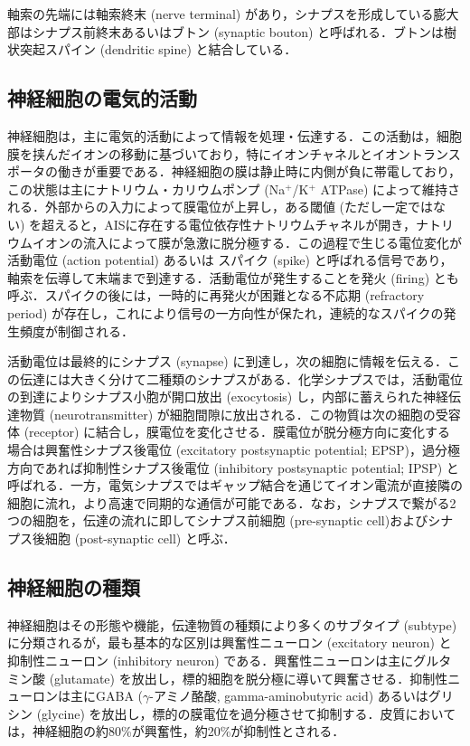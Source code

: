 \documentclass[titlepage]{ltjsbook}
\begin{document}
軸索の先端には軸索終末 (nerve terminal) があり，シナプスを形成している膨大部はシナプス前終末あるいはブトン (synaptic bouton) と呼ばれる．ブトンは樹状突起スパイン (dendritic spine) と結合している．

\subsection{神経細胞の電気的活動}
神経細胞は，主に電気的活動によって情報を処理・伝達する．この活動は，細胞膜を挟んだイオンの移動に基づいており，特にイオンチャネルとイオントランスポータの働きが重要である．神経細胞の膜は静止時に内側が負に帯電しており，この状態は主にナトリウム・カリウムポンプ (Na$^+$/K$^+$ ATPase) によって維持される．外部からの入力によって膜電位が上昇し，ある閾値 (ただし一定ではない) を超えると，AISに存在する電位依存性ナトリウムチャネルが開き，ナトリウムイオンの流入によって膜が急激に脱分極する．この過程で生じる電位変化が活動電位 (action potential) あるいは スパイク (spike) と呼ばれる信号であり，軸索を伝導して末端まで到達する．活動電位が発生することを発火 (firing) とも呼ぶ．スパイクの後には，一時的に再発火が困難となる不応期 (refractory period) が存在し，これにより信号の一方向性が保たれ，連続的なスパイクの発生頻度が制御される．

活動電位は最終的にシナプス (synapse) に到達し，次の細胞に情報を伝える．この伝達には大きく分けて二種類のシナプスがある．化学シナプスでは，活動電位の到達によりシナプス小胞が開口放出 (exocytosis) し，内部に蓄えられた神経伝達物質 (neurotransmitter) が細胞間隙に放出される．この物質は次の細胞の受容体 (receptor) に結合し，膜電位を変化させる．膜電位が脱分極方向に変化する場合は興奮性シナプス後電位 (excitatory postsynaptic potential; EPSP)，過分極方向であれば抑制性シナプス後電位 (inhibitory postsynaptic potential; IPSP) と呼ばれる．一方，電気シナプスではギャップ結合を通じてイオン電流が直接隣の細胞に流れ，より高速で同期的な通信が可能である．なお，シナプスで繋がる2つの細胞を，伝達の流れに即してシナプス前細胞 (pre-synaptic cell)およびシナプス後細胞 (post-synaptic cell) と呼ぶ．

\subsection{神経細胞の種類}
神経細胞はその形態や機能，伝達物質の種類により多くのサブタイプ (subtype) に分類されるが，最も基本的な区別は興奮性ニューロン (excitatory neuron) と抑制性ニューロン (inhibitory neuron) である．興奮性ニューロンは主にグルタミン酸 (glutamate) を放出し，標的細胞を脱分極に導いて興奮させる．抑制性ニューロンは主にGABA ($\gamma$-アミノ酪酸, gamma-aminobutyric acid) あるいはグリシン (glycine) を放出し，標的の膜電位を過分極させて抑制する．皮質においては，神経細胞の約80\%が興奮性，約20\%が抑制性とされる．
\end{document}

